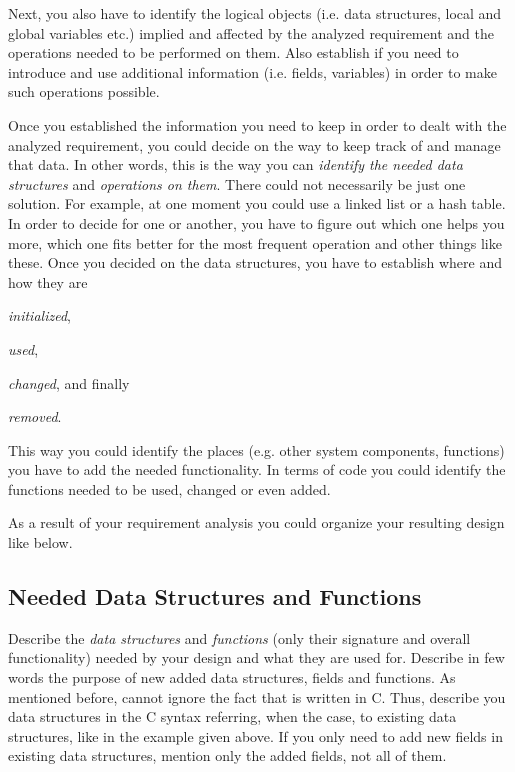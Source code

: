 Next, you also have to identify the logical objects (i.e. data structures, local and global variables etc.) implied and affected by the analyzed requirement and the operations needed to be performed on them. Also establish if you need to introduce and use additional information (i.e. fields, variables) in order to make such operations possible. 

Once you established the information you need to keep in order to dealt with the analyzed requirement, you could decide on the way to keep track of and manage that data. 
In other words, this is the way you can \textit{identify the needed data structures} and \textit{operations on them}. There could not necessarily be just one solution. For example, at one moment you could use a linked list or a hash table. In order to decide for one or another, you have to figure out which one helps you more, which one fits better for the most frequent operation and other things like these. Once you decided on the data structures, you have to establish where and how they are
\begin{inparaenum}[(1)]
    \item \textit{initialized}, 
    \item \textit{used}, 
    \item \textit{changed}, and finally 
    \item \textit{removed}.
\end{inparaenum}

This way you could identify the places (e.g. other system components, functions) you have to add the needed functionality. In terms of \OSName{} code you could identify the functions needed to be used, changed or even added. 

As a result of your requirement analysis you could organize your resulting design like below. 

\subsection{Needed Data Structures and Functions}

Describe the \textit{data structures} and \textit{functions} (only their signature and overall functionality) needed by your design and what they are used for. Describe in few words the purpose of new added data structures, fields and functions. As mentioned before, cannot ignore the fact that \OSName{} is written in C. Thus, describe you data structures in the C syntax referring, when the case, to existing data structures, like in the example given above. If you only need to add new fields in existing data structures, mention only the added fields, not all of them. 

